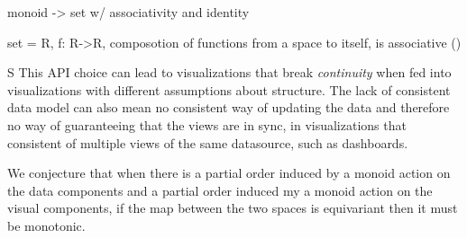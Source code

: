 monoid -> set w/ associativity and identity

set = R, f: R->R, 
composotion of functions from a space to itself, is associative (\compo)

S
This API choice can lead to visualizations that break \textit{continuity} when fed into visualizations with different assumptions about structure. The lack of consistent data model can also mean no consistent way of updating the data and therefore no way of guaranteeing that the views are in sync, in visualizations that consistent of multiple views of the same datasource, such as dashboards\cite{a.sarikayaWhatWeTalk2019,fewDashboardConfusionRevisited2007}. 


We conjecture that when there is a partial order induced by a monoid action on the data components and a partial order induced my a monoid action on the visual components, if the map between the two spaces is equivariant then it must be monotonic. 
